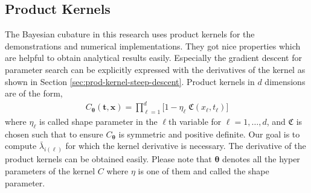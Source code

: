 \documentclass{svjour3}                     %
\newcommand{\bm}[1]{\boldsymbol{#1}}
\newcommand{\vtheta}{{\bm{\theta}}}
\newcommand{\vt}{\bm{t}}
\newcommand{\vx}{\bm{x}}
\begin{document}
\fi

































\subsection{Product Kernels}
\label{sec:product_kernel}


The Bayesian cubature in this research uses product kernels for the demonstrations and numerical implementations. They got nice properties which are helpful to obtain analytical results easily. Especially the gradient descent for parameter search can be explicitly expressed with the derivatives of the kernel as shown in Section \ref{sec:prod-kernel-steep-descent}. Product kernels in $d$ dimensions are of the form,
\begin{align}
\label{eqn:prod_kernel}
C_\vtheta(\vt, \vx) = 
\prod_{\ell=1}^d \biggl[ 1 - \eta_\ell \; \mathfrak{C}(x_\ell,t_\ell) \biggr]
\end{align}
where $\eta_\ell$ is called shape parameter in the $\ell$th variable for $\ell=1,\dots,d$, and $\mathfrak{C}$ is chosen such that to ensure $C_{\vtheta}$ is symmetric and positive definite. Our goal is to compute $\bar{\lambda}_{i(\ell)}$ for which the kernel derivative is necessary. The derivative of the product kernels can be obtained easily. Please note that $\vtheta$ denotes all the hyper parameters of the kernel $C$ where $\eta$ is one of them and called the shape parameter.
\end{document}
